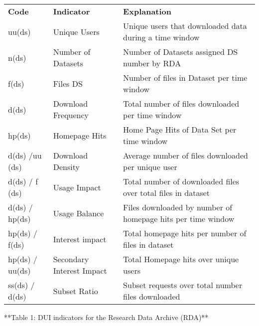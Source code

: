 \begin{table}[h]
\begin{tabular}{lll}
\textbf{Code}   & \textbf{Indicator}        & \textbf{Explanation}                                         \\
uu(ds)          & Unique Users              & Unique users that downloaded data during a time window       \\
n(ds)           & Number of Datasets        & Number of Datasets assigned DS number by RDA                 \\
f(ds)           & Files DS                  & Number of files in Dataset per time window                   \\
d(ds)           & Download Frequency        & Total number of files downloaded per time window             \\
hp(ds)          & Homepage Hits             & Home Page Hits of Data Set per time window                   \\
d(ds) /uu (ds)  & Download Density          & Average number of files downloaded per unique user           \\
d(ds) / f (ds)  & Usage Impact              & Total number of downloaded files over total files in dataset \\
d(ds) / hp(ds)  & Usage Balance             & Files downloaded by number of homepage hits per time window  \\
hp(ds) / f(ds)  & Interest impact           & Total homepage hits per number of files in dataset           \\
hp(ds) / uu(ds) & Secondary Interest Impact & Total Homepage hits over unique users                        \\
ss(ds) / d(ds)  & Subset Ratio              & Subset requests over total number files downloaded          
\end{tabular}
\end{table}
**Table 1: DUI indicators for the Research Data Archive (RDA)**
